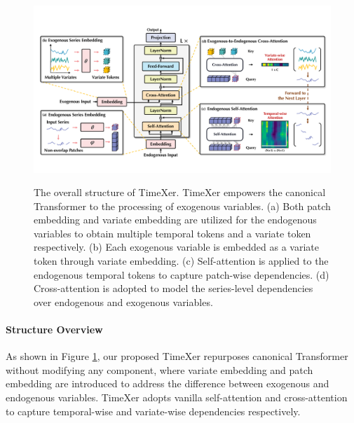 \documentclass[nohyperref]{article}
\theoremstyle{plain}
\theoremstyle{definition}
\theoremstyle{remark}
\begin{document}
\begin{figure}[h]
    \centering
   \includegraphics[width=0.98\linewidth]{fig/TimeXer.pdf}
    \label{fig:structure}
    \vspace{-5pt}
    \caption{The overall structure of TimeXer. TimeXer empowers the canonical Transformer to the processing of exogenous variables. (a) Both patch embedding and variate embedding are utilized for the endogenous variables to obtain multiple temporal tokens and a variate token respectively. (b) Each exogenous variable is embedded as a variate token through variate embedding. (c) Self-attention is applied to the endogenous temporal tokens to capture patch-wise dependencies. (d) Cross-attention is adopted to model the series-level dependencies over endogenous and exogenous variables.}
    \vspace{-10pt}
\end{figure}

\vspace{-10pt}
\paragraph{Structure Overview}
As shown in Figure \ref{fig:structure}, our proposed TimeXer repurposes canonical Transformer without modifying any component, where variate embedding and patch embedding are introduced to address the difference between exogenous and endogenous variables. TimeXer adopts vanilla self-attention and cross-attention to capture temporal-wise and variate-wise dependencies respectively. 
\end{document}
